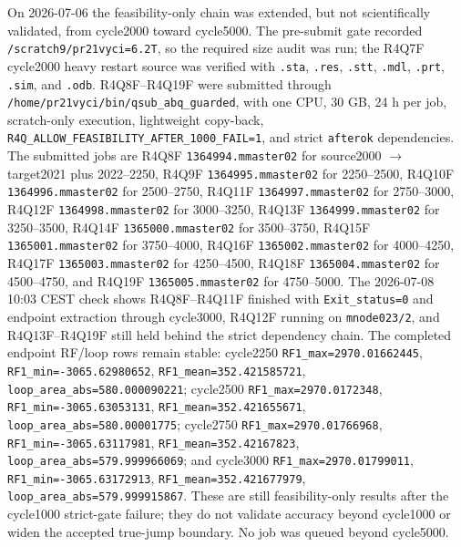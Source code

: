 \documentclass{article}
\begin{document}
On 2026-07-06 the feasibility-only chain was extended, but not scientifically validated, from cycle2000 toward cycle5000. The pre-submit gate recorded \texttt{/scratch9/pr21vyci=6.2T}, so the required size audit was run; the R4Q7F cycle2000 heavy restart source was verified with \texttt{.sta}, \texttt{.res}, \texttt{.stt}, \texttt{.mdl}, \texttt{.prt}, \texttt{.sim}, and \texttt{.odb}. R4Q8F--R4Q19F were submitted through \texttt{/home/pr21vyci/bin/qsub\_abq\_guarded}, with one CPU, 30 GB, 24 h per job, scratch-only execution, lightweight copy-back, \texttt{R4Q\_ALLOW\_FEASIBILITY\_AFTER\_1000\_FAIL=1}, and strict \texttt{afterok} dependencies. The submitted jobs are R4Q8F \texttt{1364994.mmaster02} for source2000 \(\rightarrow\) target2021 plus 2022--2250, R4Q9F \texttt{1364995.mmaster02} for 2250--2500, R4Q10F \texttt{1364996.mmaster02} for 2500--2750, R4Q11F \texttt{1364997.mmaster02} for 2750--3000, R4Q12F \texttt{1364998.mmaster02} for 3000--3250, R4Q13F \texttt{1364999.mmaster02} for 3250--3500, R4Q14F \texttt{1365000.mmaster02} for 3500--3750, R4Q15F \texttt{1365001.mmaster02} for 3750--4000, R4Q16F \texttt{1365002.mmaster02} for 4000--4250, R4Q17F \texttt{1365003.mmaster02} for 4250--4500, R4Q18F \texttt{1365004.mmaster02} for 4500--4750, and R4Q19F \texttt{1365005.mmaster02} for 4750--5000. The 2026-07-08 10:03 CEST check shows R4Q8F--R4Q11F finished with \texttt{Exit\_status=0} and endpoint extraction through cycle3000, R4Q12F running on \texttt{mnode023/2}, and R4Q13F--R4Q19F still held behind the strict dependency chain. The completed endpoint RF/loop rows remain stable: cycle2250 \texttt{RF1\_max=2970.01662445}, \texttt{RF1\_min=-3065.62980652}, \texttt{RF1\_mean=352.421585721}, \texttt{loop\_area\_abs=580.000090221}; cycle2500 \texttt{RF1\_max=2970.0172348}, \texttt{RF1\_min=-3065.63053131}, \texttt{RF1\_mean=352.421655671}, \texttt{loop\_area\_abs=580.00001775}; cycle2750 \texttt{RF1\_max=2970.01766968}, \texttt{RF1\_min=-3065.63117981}, \texttt{RF1\_mean=352.42167823}, \texttt{loop\_area\_abs=579.999966069}; and cycle3000 \texttt{RF1\_max=2970.01799011}, \texttt{RF1\_min=-3065.63172913}, \texttt{RF1\_mean=352.421677979}, \texttt{loop\_area\_abs=579.999915867}. These are still feasibility-only results after the cycle1000 strict-gate failure; they do not validate accuracy beyond cycle1000 or widen the accepted true-jump boundary. No job was queued beyond cycle5000.
\end{document}
